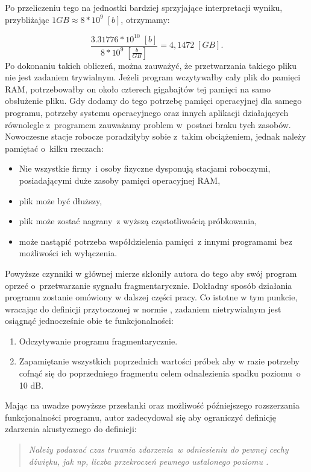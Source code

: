 \documentclass[eng,printmode]{mgr}
\begin{document}
Po przeliczeniu tego na jednostki bardziej sprzyjające interpretacji wyniku, przybliżając $1GB \approx 8*10^9\;[b]$, otrzymamy:


\begin{equation}
\frac{3.31776*10^10\;[b]}{8*10^9\;[\frac{b}{GB}]} = 4,1472\;[GB].
\end{equation}
Po dokonaniu takich obliczeń, można zauważyć, że przetwarzania takiego pliku nie jest zadaniem trywialnym. Jeżeli program wczytywałby cały plik do pamięci RAM, potrzebowałby on około czterech gigabajtów tej pamięci na samo obsłużenie pliku. Gdy dodamy do tego potrzebę pamięci operacyjnej dla samego programu, potrzeby systemu operacyjnego oraz innych aplikacji działających równolegle z~programem zauważamy problem w~postaci braku tych zasobów. Nowoczesne stacje robocze poradziłyby sobie z~takim obciążeniem, jednak należy pamiętać o~kilku rzeczach:
\begin{itemize}
\item Nie wszystkie firmy~i osoby fizyczne dysponują stacjami roboczymi, posiadającymi duże zasoby pamięci operacyjnej RAM,
\item plik może być dłuższy,
\item plik może zostać nagrany~z wyższą częstotliwością próbkowania,
\item może nastąpić potrzeba współdzielenia pamięci~z innymi programami bez możliwości ich wyłączenia.
\end{itemize}

Powyższe czynniki w głównej mierze skłoniły autora do tego aby swój program oprzeć o~przetwarzanie sygnału fragmentarycznie. Dokładny sposób działania programu zostanie omówiony w dalszej części pracy. Co istotne w tym punkcie, wracając do definicji przytoczonej w normie \cite{PN-ISO-1996-1:2006}, zadaniem nietrywialnym jest osiągnąć jednocześnie obie te funkcjonalności:
\begin{enumerate}
\item Odczytywanie programu fragmentarycznie.
\item Zapamiętanie wszystkich poprzednich wartości próbek aby w razie potrzeby cofnąć się do poprzedniego fragmentu celem odnalezienia spadku poziomu~o 10 dB.
\end{enumerate}

Mając na uwadze powyższe przesłanki oraz możliwość późniejszego rozszerzania funkcjonalności programu, autor zadecydował się aby ograniczyć definicję zdarzenia akustycznego do definicji:

\begin{quote}
\textit{Należy podawać czas trwania zdarzenia~w odniesieniu do pewnej cechy dźwięku, jak np, liczba przekroczeń pewnego ustalonego poziomu \newline \cite{PN-ISO-1996-1:2006}.}
\end{quote}
\end{document}
